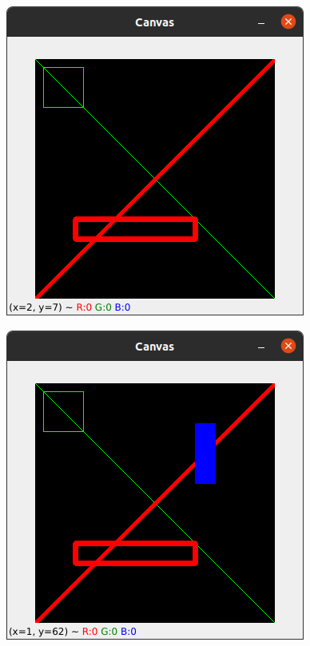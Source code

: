 \documentclass[12pt,letterpaper]{article}
\begin{document}
\begin{multicols}{2}
\begin{figure}[H]
\centering
\includegraphics[width = \columnwidth]{Resultado4_ch5.png}
\end{figure}

\begin{figure}[H]
\centering
\includegraphics[width = \columnwidth]{Resultado5_ch5.png}
\end{figure}


\end{multicols}
\end{document}
